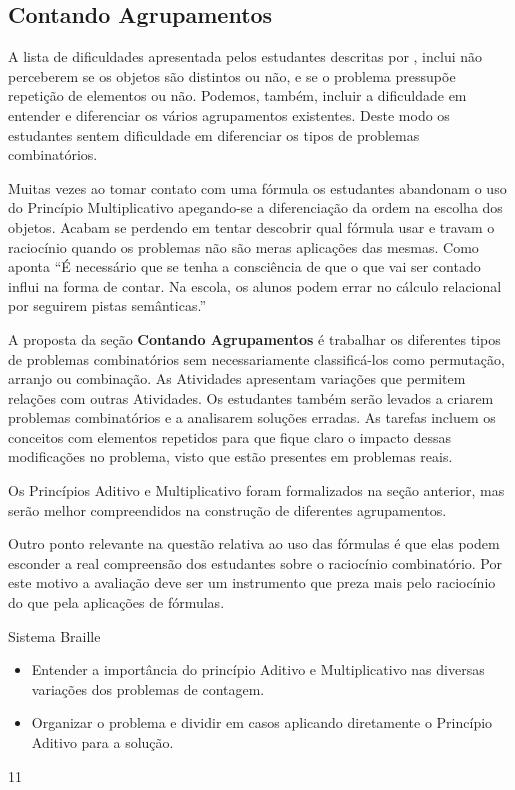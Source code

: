 \clearpage
\def\currentcolor{session1}
\begin{texto}
{
  \section{Contando Agrupamentos}

A lista de dificuldades apresentada pelos estudantes descritas por \cite{Renan}, inclui não perceberem se os objetos são distintos ou não, e se o problema pressupõe repetição de elementos ou não. Podemos, também, incluir a dificuldade em entender e diferenciar os vários agrupamentos existentes. Deste modo os estudantes sentem dificuldade em diferenciar os tipos de problemas combinatórios. 

Muitas vezes ao tomar contato com uma fórmula os estudantes abandonam o uso do Princípio Multiplicativo apegando-se a diferenciação da ordem na escolha dos objetos. Acabam se perdendo em tentar descobrir qual fórmula usar e travam o raciocínio quando os problemas não são meras aplicações das mesmas. Como aponta \cite{Cristiane} ``É necessário que se tenha a consciência de que o que vai ser   contado influi na forma de contar. Na escola, os alunos podem errar no cálculo relacional por seguirem pistas semânticas.''

A proposta da seção \textbf{Contando Agrupamentos} é trabalhar os diferentes tipos de problemas combinatórios sem necessariamente classificá-los como permutação, arranjo ou combinação. As Atividades apresentam variações que permitem relações com outras Atividades. Os estudantes também serão levados a criarem problemas combinatórios e a analisarem soluções erradas. As tarefas incluem os conceitos com elementos repetidos para que fique claro o impacto dessas modificações no problema, visto que estão presentes em problemas reais.

Os Princípios Aditivo e Multiplicativo foram formalizados na seção anterior, mas serão melhor compreendidos na construção de diferentes agrupamentos.

Outro ponto relevante na questão relativa ao uso das fórmulas é que elas podem esconder a real compreensão dos estudantes sobre o raciocínio combinatório. Por este motivo a avaliação deve ser um instrumento que preza mais pelo raciocínio do que pela aplicações de fórmulas.
}
\end{texto}
\begin{objectives}{Sistema Braille}
{
\begin{itemize}
\item Entender a importância do princípio Aditivo e Multiplicativo nas diversas variações dos problemas de contagem. 
\item Organizar o problema e dividir em casos aplicando diretamente o Princípio Aditivo para a solução.
\end{itemize}
}{1}{1}
\end{objectives}
